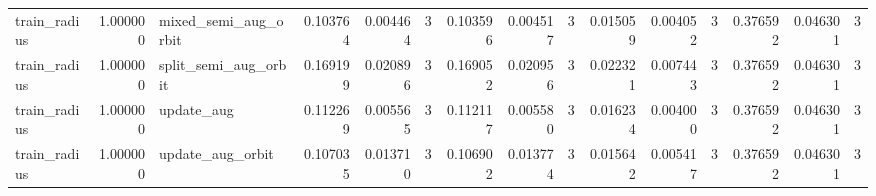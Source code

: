 \begin{tabular}{lrlrrrrrrrrrrrr}
train_radius & 1.000000 & mixed_semi_aug_orbit & 0.103764 & 0.004464 & 3 & 0.103596 & 0.004517 & 3 & 0.015059 & 0.004052 & 3 & 0.376592 & 0.046301 & 3 \\
train_radius & 1.000000 & split_semi_aug_orbit & 0.169199 & 0.020896 & 3 & 0.169052 & 0.020956 & 3 & 0.022321 & 0.007443 & 3 & 0.376592 & 0.046301 & 3 \\
train_radius & 1.000000 & update_aug & 0.112269 & 0.005565 & 3 & 0.112117 & 0.005580 & 3 & 0.016234 & 0.004000 & 3 & 0.376592 & 0.046301 & 3 \\
train_radius & 1.000000 & update_aug_orbit & 0.107035 & 0.013710 & 3 & 0.106902 & 0.013774 & 3 & 0.015642 & 0.005417 & 3 & 0.376592 & 0.046301 & 3 \\
\bottomrule
\end{tabular}
